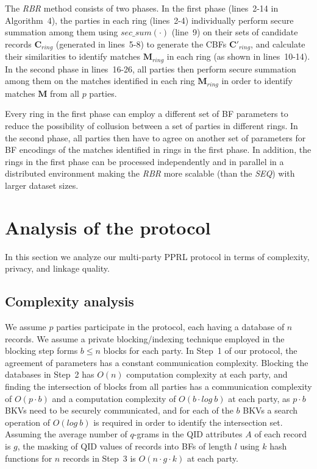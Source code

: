 \documentclass{sig-alternate}
\begin{document}
The \emph{RBR} method consists of two phases. 
In the first phase (lines~2-14 in Algorithm~4), the parties in each ring
(lines~2-4) individually perform
secure summation among them using $sec\_sum(\cdot)$ (line~9) on their sets of candidate records $\mathbf{C}_{ring}$
(generated in lines~5-8) to generate the CBFs $\mathbf{C'}_{ring}$, and calculate their
similarities to identify matches $\mathbf{M}_{ring}$ in each ring (as shown in lines~10-14).
In the second phase in lines~16-26, all parties 
then perform secure summation among them on the
matches identified in each ring $\mathbf{M}_{ring}$ in order to identify matches
$\mathbf{M}$ from
all $p$ parties.

Every ring in the first phase can employ a different set of BF
parameters to reduce the possibility of collusion between 
a set of parties in different rings. In the second phase,
all parties then have to agree on another
set of parameters for BF encodings of the matches identified in rings
in the first phase.
In addition, the rings in the first phase can be processed independently
and in parallel in a distributed environment making the \emph{RBR} more scalable
(than the \emph{SEQ}) with larger dataset sizes. 


\section{Analysis of the protocol}
\label{sec-analysis}

In this section we analyze our multi-party PPRL protocol
in terms of complexity, privacy, and linkage quality.

\subsection{Complexity analysis}
\label{subsec_comp_analsis}

We assume $p$ parties participate in the protocol, each having a
database of $n$ records. We assume a private blocking/indexing
technique employed in the blocking step forms
$b \le n$ blocks for each party.
In Step~1 of our protocol, the agreement of parameters has a constant
communication complexity.  
Blocking the databases in Step~2 has $O(n)$
computation complexity at each party, and
finding the intersection of blocks from all parties has a
communication complexity of $O(p\cdot b)$ and a computation complexity of
$O(b\cdot log~b)$ at each party, as $p\cdot b$ BKVs need to be securely 
communicated, and for each of the $b$ BKVs a search operation of
$O(log~b)$ is required in order to identify the intersection set. 
Assuming the average
number of $q$-grams in the QID attributes $A$ of each record is $g$, 
the masking of QID values of records into
BFs of length $l$ using $k$ hash functions for $n$
records in Step~3 is $O(n\cdot g\cdot k)$ at each party.
\end{document}
